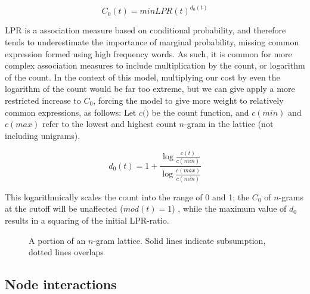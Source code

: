 \documentclass[11pt]{article}
\begin{document}
\begin{displaymath}
C_0(t) = minLPR(t)^{d_0(t)}
\end{displaymath}

LPR is a association measure based on conditional probability, and therefore tends to underestimate the importance of marginal probability, missing common expression formed using high frequency words. As such, it is common for more complex association measures to include multiplication by the count, or logarithm of the count. In the context of this model, multiplying our cost by even the logarithm of the count would be far too extreme, but we can give apply a more restricted increase to $C_0$, forcing the model to give more weight to relatively common expressions, as follows: Let $c(\dot)$ be the count function, and $c(min)$ and $c(max)$ refer to the lowest and highest count $n$-gram in the lattice (not including unigrams). 

\begin{displaymath}
d_0(t) = 1 + \frac{\log\frac{c(t)}{c(min)}}{\log\frac{c(max)}{c(min)}}
\end{displaymath}

This logarithmically scales the count into the range of 0 and 1; the $C_0$ of $n$-grams at the cutoff will be unaffected ($mod(t) = 1$) , while the maximum value of $d_0$ results in a squaring of the initial LPR-ratio.

\begin{figure}[!tb]
\caption{A portion of an $n$-gram lattice. Solid lines indicate subsumption, dotted lines overlaps}
\end{figure}

\subsection{Node interactions}
\end{document}
